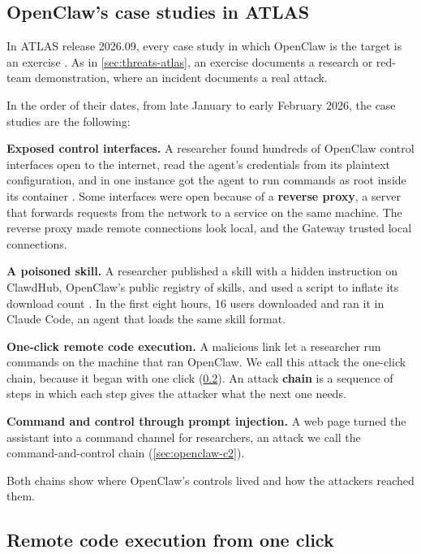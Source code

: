 \subsection{OpenClaw's case studies in ATLAS}
\label{sec:openclaw-atlas}

In ATLAS release 2026.09, every case study in which OpenClaw is the target is an exercise
\citep{mitre-atlas-2026}. As in \cref{sec:threats-atlas}, an exercise documents a research or
red-team demonstration, where an incident documents a real attack.

In the order of their dates, from late January to early February 2026, the case studies are the
following:
\bi
\item \textbf{Exposed control interfaces.} A researcher found hundreds of OpenClaw control
interfaces open to the internet, read the agent's credentials from its plaintext configuration, and
in one instance got the agent to run commands as root inside its container \citep{atlas-cs0048}.
Some interfaces were open because of a \textbf{reverse proxy}, a server that forwards requests from
the network to a service on the same machine. The reverse proxy made remote connections look local,
and the Gateway trusted local connections.
\item \textbf{A poisoned skill.} A researcher published a skill with a hidden instruction on
ClawdHub, OpenClaw's public registry of skills, and used a script to inflate its download count
\citep{atlas-cs0049}. In the first eight hours, 16 users downloaded and ran it in Claude Code, an
agent that loads the same skill format.
\item \textbf{One-click remote code execution.} A malicious link let a researcher run commands on
the machine that ran OpenClaw. We call this attack the one-click chain, because it began with one
click (\cref{sec:openclaw-rce}). An attack \textbf{chain} is a sequence of steps in which each step
gives the attacker what the next one needs.
\item \textbf{Command and control through prompt injection.} A web page turned the assistant into
a command channel for researchers, an attack we call the command-and-control chain
(\cref{sec:openclaw-c2}).
\ei

Both chains show where OpenClaw's controls lived and how the attackers reached them.

\subsection{Remote code execution from one click}
\label{sec:openclaw-rce}

